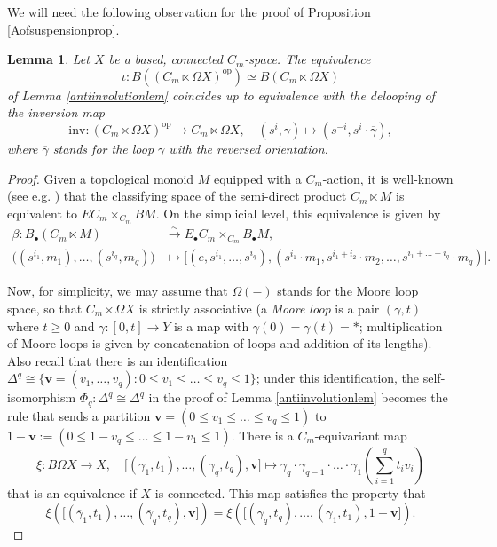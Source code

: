 \documentclass[a4paper, oneside]{amsart}
\newcommand{\1}{\mathds{1}}
\newtheorem{lem}[thm]{Lemma}
\theoremstyle{remark}
\theoremstyle{definition}
\numberwithin{equation}{section}
\begin{document}
We will need the following observation for the proof of Proposition \ref{Aofsuspensionprop}.



\begin{lem}\label{semidirectproductlem}
    Let $X$ be a based, connected $C_m$-space. The equivalence
    $$
\iota: B((C_m\ltimes \Omega X)^{\mathrm{op}})\simeq B(C_m\ltimes \Omega X)
    $$
    of Lemma \ref{antiinvolutionlem} coincides up to equivalence with the delooping of the inversion map
    $$
\mathrm{inv}:(C_m\ltimes \Omega X)^{\mathrm{op}}\longrightarrow C_m\ltimes \Omega X, \quad (s^{i},\gamma)\mapsto (s^{-i}, s^{i}\cdot \overline{\gamma}),
    $$
    where $\overline{\gamma}$ stands for the loop $\gamma$ with the reversed orientation. 
\end{lem}
\begin{proof}
Given a topological monoid $M$ equipped with a $C_m$-action, it is well-known (see e.g. \cite[\S II, Thm. 1.12]{Adem2004}) that the classifying space of the semi-direct product $C_m\ltimes M$ is equivalent to $EC_m\times_{C_m}BM$. On the simplicial level, this equivalence is given by
    \begin{align*}
\beta: B_\bullet(C_m\ltimes M)&\overset{\sim}\longrightarrow E_\bullet C_m\times_{C_m}B_\bullet M,\\
\big((s^{i_1},m_1),\dots,(s^{i_q},m_q)\big)&\longmapsto\big[(e,s^{i_1},\dots, s^{i_q}),(s^{i_1}\cdot m_1,s^{i_1+i_2}\cdot m_2,\dots,s^{i_1+\dots+i_q}\cdot m_q)\big].
\end{align*}

Now, for simplicity, we may assume that $\Omega(-)$ stands for the Moore loop space, so that $C_m\ltimes\Omega X$ is strictly associative (a \textit{Moore loop} is a pair $(\gamma,t)$ where $t\geq 0$ and $\gamma: [0,t]\to Y$ is a map with $\gamma(0)=\gamma(t)=*$; multiplication of Moore loops is given by concatenation of loops and addition of its lengths). Also recall that there is an identification $\Delta^q\cong\{\mathbf{v}=(v_1,\dots, v_q): 0\leq v_1\leq\dots\leq v_q\leq 1\}$; under this identification, the self-isomorphism $\Phi_q: \Delta^q\cong \Delta^q$ in the proof of Lemma \ref{antiinvolutionlem} becomes the rule that sends a partition $\mathbf{v}=(0\leq v_1\leq\dots\leq v_q\leq 1)$ to $1-\mathbf{v}:=(0\leq 1-v_q\leq\dots\leq 1-v_1\leq 1)$. There is a $C_m$-equivariant map 
 $$
\xi: B\Omega X\longrightarrow X, \quad \big[(\gamma_1,t_1),\dots, (\gamma_q,t_q),\mathbf{v}\big]\longmapsto \gamma_q\cdot\gamma_{q-1}\cdot\dotso\cdot \gamma_1\left(\sum_{i=1}^qt_iv_i\right)
$$
that is an equivalence if $X$ is connected. This map satisfies the property that
$$
\xi\left(\big[(\overline{\gamma}_1,t_1),\dots, (\overline{\gamma}_q,t_q),\mathbf{v}\big]\right)=\xi\left(\big[(\gamma_q,t_q),\dots, (\gamma_1,t_1),1-\mathbf{v}\big]\right).
$$


\end{proof}
\end{document}
